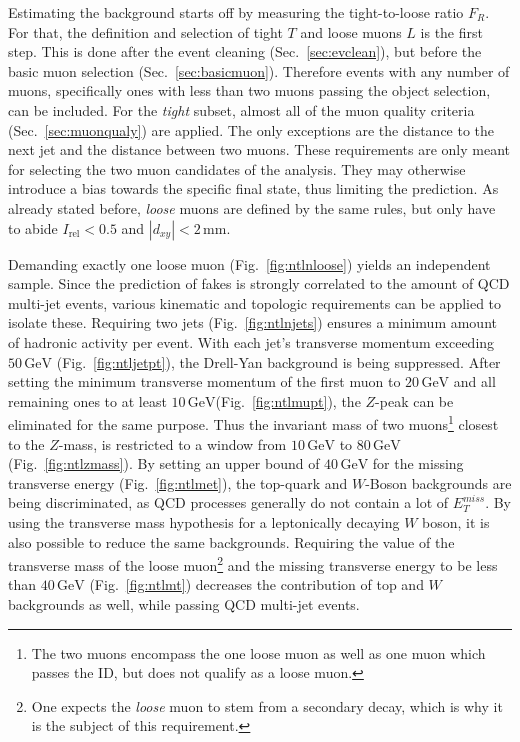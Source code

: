 Estimating the background starts off by measuring the tight-to-loose ratio $F_R$. For that, the definition and selection of tight $T$ and loose muons $L$ is the first step. This is done after the event cleaning (Sec.~\ref{sec:evclean}), but before the basic muon selection (Sec.~\ref{sec:basicmuon}). Therefore events with any number of muons, specifically ones with less than two muons passing the object selection, can be included. For the \textit{tight} subset, almost all of the muon quality criteria (Sec.~\ref{sec:muonqualy}) are applied. The only exceptions are the distance to the next jet and the distance between two muons. These requirements are only meant for selecting the two muon candidates of the analysis. They may otherwise introduce a bias towards the specific final state, thus limiting the prediction. As already stated before, \textit{loose} muons are defined by the same rules, but only have to abide $I_{\text{rel}} < 0.5$ and $|d_{xy}| < 2\,\text{mm}$.

Demanding exactly one loose muon (Fig.~\ref{fig:ntlnloose}) yields an independent sample. Since the prediction of fakes is strongly correlated to the amount of QCD multi-jet events, various kinematic and topologic requirements can be applied to isolate these. Requiring two jets (Fig.~\ref{fig:ntlnjets}) ensures a minimum amount of hadronic activity per event. With each jet's transverse momentum exceeding $50\,\text{GeV}$ (Fig.~\ref{fig:ntljetpt}), the Drell-Yan background is being suppressed. After setting the minimum transverse momentum of the first muon to $20\,\text{GeV}$ and all remaining ones to at least $10\,\text{GeV}$(Fig.~\ref{fig:ntlmupt}), the $Z$-peak can be eliminated for the same purpose. Thus the invariant mass of two muons\footnote{The two muons encompass the one loose muon as well as one muon which passes the ID, but does not qualify as a loose muon.} closest to the $Z$-mass, is restricted to a window from $10\,\text{GeV}$ to $80\,\text{GeV}$ (Fig.~\ref{fig:ntlzmass}). By setting an upper bound of $40\,\text{GeV}$ for the missing transverse energy (Fig.~\ref{fig:ntlmet}), the top-quark and $W$-Boson backgrounds are being discriminated, as QCD processes generally do not contain a lot of $E_{T}^{miss}$. By using the transverse mass hypothesis for a leptonically decaying $W$ boson, it is also possible to reduce the same backgrounds.
Requiring the value of the transverse mass of the loose muon\footnote{One expects the \textit{loose} muon to stem from a secondary decay, which is why it is the subject of this requirement.} and the missing transverse energy to be less than $40\,\text{GeV}$ (Fig.~\ref{fig:ntlmt}) decreases the contribution of top and $W$ backgrounds as well, while passing QCD multi-jet events. 


